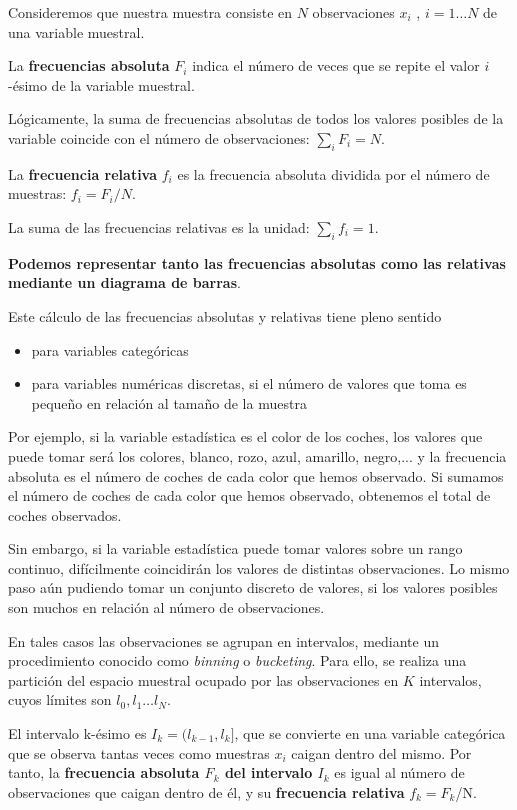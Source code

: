 \documentclass[11pt]{article}
\providecommand{\tightlist}{%
      \setlength{\itemsep}{0pt}\setlength{\parskip}{0pt}}
\begin{document}
Consideremos que nuestra muestra consiste en \(N\) observaciones \(x_i\)
, \(i = 1 \ldots N\) de una variable muestral.

La \textbf{frecuencias absoluta} \(F_i\) indica el número de veces que
se repite el valor \(i\)-ésimo de la variable muestral.

Lógicamente, la suma de frecuencias absolutas de todos los valores
posibles de la variable coincide con el número de observaciones:
\(\sum_i F_i = N\).

    La \textbf{frecuencia relativa} \(f_i\) es la frecuencia absoluta
dividida por el número de muestras: \(f_i=F_i/N\).

La suma de las frecuencias relativas es la unidad: \(\sum_i f_i = 1\).

    \textbf{Podemos representar tanto las frecuencias absolutas como las
relativas mediante un diagrama de barras}.

    Este cálculo de las frecuencias absolutas y relativas tiene pleno
sentido

\begin{itemize}
\tightlist
\item
  para variables categóricas
\item
  para variables numéricas discretas, si el número de valores que toma
  es pequeño en relación al tamaño de la muestra
\end{itemize}

Por ejemplo, si la variable estadística es el color de los coches, los
valores que puede tomar será los colores, blanco, rozo, azul, amarillo,
negro,... y la frecuencia absoluta es el número de coches de cada color
que hemos observado. Si sumamos el número de coches de cada color que
hemos observado, obtenemos el total de coches observados.

    Sin embargo, si la variable estadística puede tomar valores sobre un
rango continuo, difícilmente coincidirán los valores de distintas
observaciones. Lo mismo paso aún pudiendo tomar un conjunto discreto de
valores, si los valores posibles son muchos en relación al número de
observaciones.

En tales casos las observaciones se agrupan en intervalos, mediante un
procedimiento conocido como \emph{binning} o \emph{bucketing}. Para
ello, se realiza una partición del espacio muestral ocupado por las
observaciones en \(K\) intervalos, cuyos límites son
\(l_0, l_1 \ldots l_N\).

El intervalo k-ésimo es \(I_k = (l_{k-1}, l_k]\), que se convierte en
una variable categórica que se observa tantas veces como muestras
\(x_i\) caigan dentro del mismo. Por tanto, la \textbf{frecuencia
absoluta \(F_k\) del intervalo \(I_k\)} es igual al número de
observaciones que caigan dentro de él, y su \textbf{frecuencia relativa}
\(f_k = F_k\)/N.
\end{document}
